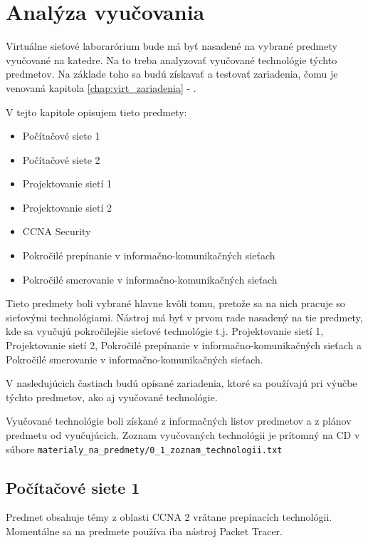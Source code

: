 \chapter{Analýza vyučovania}
\label{chap:analyza_vyucovania}

Virtuálne sieťové laborarórium bude má byť nasadené na vybrané predmety vyučované na katedre. Na to treba analyzovať vyučované technológie týchto predmetov. Na základe toho sa budú získavať a testovať zariadenia, čomu je venovaná kapitola \ref{chap:virt_zariadenia} - .

V tejto kapitole opisujem tieto predmety:
\begin{itemize}
    \item Počítačové siete 1
    \item Počítačové siete 2
    \item Projektovanie sietí 1
    \item Projektovanie sietí 2
    \item CCNA Security
    \item Pokročilé prepínanie v informačno-komunikačných sieťach
    \item Pokročilé smerovanie v informačno-komunikačných sieťach
\end{itemize}

Tieto predmety boli vybrané hlavne kvôli tomu, pretože sa na nich pracuje so sieťovými technológiami. Nástroj má byť v prvom rade nasadený na tie predmety, kde sa vyučujú pokročilejšie sieťové technológie t.j. Projektovanie sietí 1, Projektovanie sietí 2, Pokročilé prepínanie v informačno-komunikačných sieťach a Pokročilé smerovanie v informačno-komunikačných sieťach.

V nasledujúcich častiach budú opísané zariadenia, ktoré sa používajú pri výučbe týchto predmetov, ako aj vyučované technológie.

Vyučované technológie boli získané z informačných listov predmetov a z plánov predmetu od vyučujúcich. Zoznam vyučovaných technológii je prítomný na CD v súbore \texttt{materialy\_na\_predmety/0\_1\_zoznam\_technologii.txt}




\section{Počítačové siete 1}

Predmet obsahuje témy z oblasti CCNA 2 vrátane prepínacích technológii. Momentálne sa na predmete používa iba nástroj Packet Tracer.

